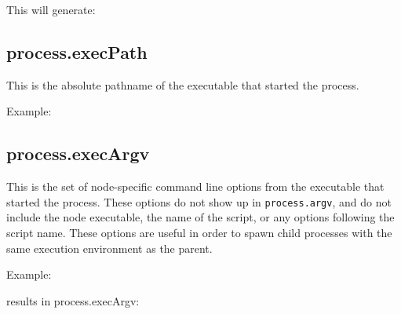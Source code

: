 This will generate:

\begin{Shaded}
\begin{Highlighting}[]
\NormalTok{: }
\end{Highlighting}
\end{Shaded}

\subsection{process.execPath}\label{process.execpath}

This is the absolute pathname of the executable that started the
process.

Example:

\begin{Shaded}
\begin{Highlighting}[]
\end{Highlighting}
\end{Shaded}

\subsection{process.execArgv}\label{process.execargv}

This is the set of node-specific command line options from the
executable that started the process. These options do not show up in
\texttt{process.argv}, and do not include the node executable, the name
of the script, or any options following the script name. These options
are useful in order to spawn child processes with the same execution
environment as the parent.

Example:

\begin{Shaded}
\begin{Highlighting}[]
 
\end{Highlighting}
\end{Shaded}

results in process.execArgv:

\begin{Shaded}
\begin{Highlighting}[]
\NormalTok{[}\NormalTok{]}
\end{Highlighting}
\end{Shaded}

